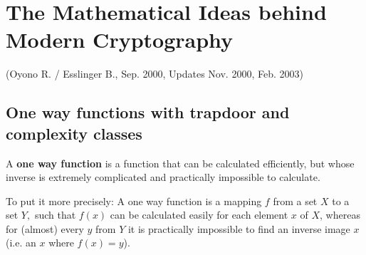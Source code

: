


\setlength{\fboxrule}{.4pt}
\setlength{\fboxsep}{4pt}

\newpage
\section{The Mathematical Ideas behind Modern Cryptography}
\label{Chapter_ModernCryptography}
\hypertarget{Chapter_ModernCryptography}{}
(Oyono R. / Esslinger B., Sep. 2000, Updates Nov. 2000, Feb. 2003)

\subsection{One way functions with trapdoor and complexity classes}
  \hypertarget{OneWayFunktion1}{}
A {\bf one way function} is a function that can be calculated 
efficiently, but whose inverse is extremely complicated and practically 
impossible to calculate.\par

To put it more precisely:  A one way function is a mapping $ f $ from a set $ X 
$ to a set $ Y, $ such that $ f(x) $ can be calculated easily for each element $ 
x $ of $ X $, whereas for (almost) every $ y $ from $ Y $  it is practically 
impossible to find an inverse image $ x $ (i.e. an $ x $ where $ f(x)=y $).\par


